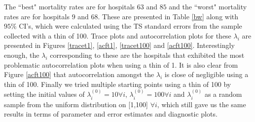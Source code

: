 \documentclass[12pt, leqno]{article}
\begin{document}
The ``best" mortality rates are for
hospitals $63$ and $85$ and the ``worst" mortality rates are for
hospitals $9$
and $68$. These are presented in Table \ref{bw} along with $95\%$ CI's,
which were calculated using the TS standard errors from the sample
collected with a thin of 100. Trace
plots and autocorrelation plots for these $\lambda_i$ are presented in Figures \ref{tracet1},
\ref{acft1}, \ref{tracet100} and \ref{acft100}. Interestingly enough,
the $\lambda_i$ corresponding to 
these are the hospitals that exhibited the most problematic autocorrelation
plots when using a thin of 1. It is also clear from Figure \ref{acft100} that autocorrelation amongst
the $\lambda_i$ is close of negligible using a thin of 100. Finally we tried
multiple starting points using a thin of 100 by setting the
initial values of $\lambda_i^{(0)} = 10 \forall i$, $\lambda_i^{(0)} = 100
\forall i$ and $\lambda_i^{(0)}$ as a random sample from the uniform
distribution on [1,100]
$\forall i$, which still gave us the same results in terms of
parameter and error
estimates and diagnostic plots. 

\begin{table}[ht]
\centering
{}
\caption{Best and Worst Hospitals based on mortality rates using a thin of 100} 
\label{bw}
\end{table}

\clearpage

\end{document}
